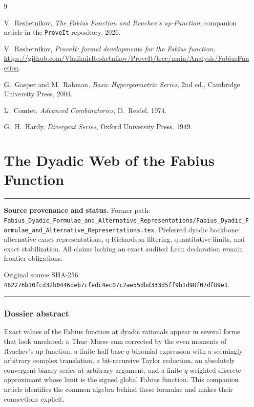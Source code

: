 \documentclass[11pt,oneside]{article}
\theoremstyle{definition}
\theoremstyle{remark}
\newenvironment{boxedremark}{%
  \par\smallskip\noindent\begin{center}\begin{minipage}{0.94\textwidth}%
  \color{black}\hrule\vspace{0.6em}\small
}{%
  \vspace{0.6em}\hrule\end{minipage}\end{center}\smallskip
}
\begin{document}
\renewcommand{\refname}{Dossier references}
\begin{thebibliography}{9}

V.~Reshetnikov,
\emph{The Fabius Function and Rvachev's up-Function},
companion article in the \texttt{ProveIt} repository, 2026.

V.~Reshetnikov,
\emph{ProveIt: formal developments for the Fabius function},
\url{https://github.com/VladimirReshetnikov/ProveIt/tree/main/Analysis/FabiusFunction}.

G.~Gasper and M.~Rahman,
\emph{Basic Hypergeometric Series}, 2nd ed.,
Cambridge University Press, 2004.

L.~Comtet,
\emph{Advanced Combinatorics},
D.~Reidel, 1974.

G.~H.~Hardy,
\emph{Divergent Series},
Oxford University Press, 1949.

\end{thebibliography}


\renewcommand{\arraystretch}{1}


\clearpage
\part{The Dyadic Web of the Fabius Function}
\label{part:dyadicweb}
\begin{boxedremark}
\textbf{Source provenance and status.} Former path: \nolinkurl{Fabius_Dyadic_Formulae_and_Alternative_Representations/Fabius_Dyadic_Formulae_and_Alternative_Representations.tex}.  Preferred dyadic backbone: alternative exact representations, q-Richardson filtering, quantitative limits, and exact stabilization.  All claims lacking an exact audited Lean declaration remain frontier obligations.\par\smallskip Original source SHA-256: \nolinkurl{462276b10fcd32b0446deb7cfedc4ec07c2ae55dbd333d5ff9b1d98f07df89e1}.
\end{boxedremark}
\section*{Dossier abstract}
Exact values of the Fabius function at dyadic rationals appear in several forms that look
unrelated: a Thue--Morse sum corrected by the even moments of Rvachev's up-function, a finite
half-base $q$-binomial expression with a seemingly arbitrary complex translation, a
bit-recursive Taylor reduction, an absolutely convergent binary series at arbitrary argument,
and a finite $q$-weighted discrete approximant whose limit is the signed global Fabius
function.  This companion article identifies the common algebra behind these formulae and
makes their connections explicit.
\end{document}
